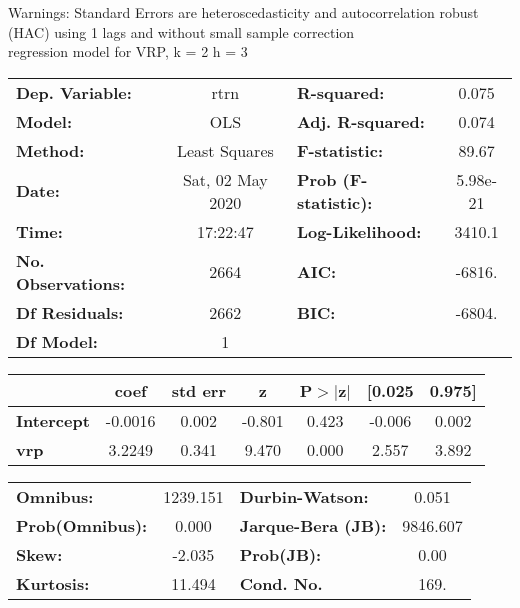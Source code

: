 Warnings: \newline
 [1] Standard Errors are heteroscedasticity and autocorrelation robust (HAC) using 1 lags and without small sample correction\\ 

regression model for VRP, k = 2 h = 3\begin{center}
\begin{tabular}{lclc}
\toprule
\textbf{Dep. Variable:}    &       rtrn       & \textbf{  R-squared:         } &     0.075   \\
\textbf{Model:}            &       OLS        & \textbf{  Adj. R-squared:    } &     0.074   \\
\textbf{Method:}           &  Least Squares   & \textbf{  F-statistic:       } &     89.67   \\
\textbf{Date:}             & Sat, 02 May 2020 & \textbf{  Prob (F-statistic):} &  5.98e-21   \\
\textbf{Time:}             &     17:22:47     & \textbf{  Log-Likelihood:    } &    3410.1   \\
\textbf{No. Observations:} &        2664      & \textbf{  AIC:               } &    -6816.   \\
\textbf{Df Residuals:}     &        2662      & \textbf{  BIC:               } &    -6804.   \\
\textbf{Df Model:}         &           1      & \textbf{                     } &             \\
\bottomrule
\end{tabular}
\begin{tabular}{lcccccc}
                   & \textbf{coef} & \textbf{std err} & \textbf{z} & \textbf{P$> |$z$|$} & \textbf{[0.025} & \textbf{0.975]}  \\
\midrule
\textbf{Intercept} &      -0.0016  &        0.002     &    -0.801  &         0.423        &       -0.006    &        0.002     \\
\textbf{vrp}       &       3.2249  &        0.341     &     9.470  &         0.000        &        2.557    &        3.892     \\
\bottomrule
\end{tabular}
\begin{tabular}{lclc}
\textbf{Omnibus:}       & 1239.151 & \textbf{  Durbin-Watson:     } &    0.051  \\
\textbf{Prob(Omnibus):} &   0.000  & \textbf{  Jarque-Bera (JB):  } & 9846.607  \\
\textbf{Skew:}          &  -2.035  & \textbf{  Prob(JB):          } &     0.00  \\
\textbf{Kurtosis:}      &  11.494  & \textbf{  Cond. No.          } &     169.  \\
\bottomrule
\end{tabular}
\end{center}

